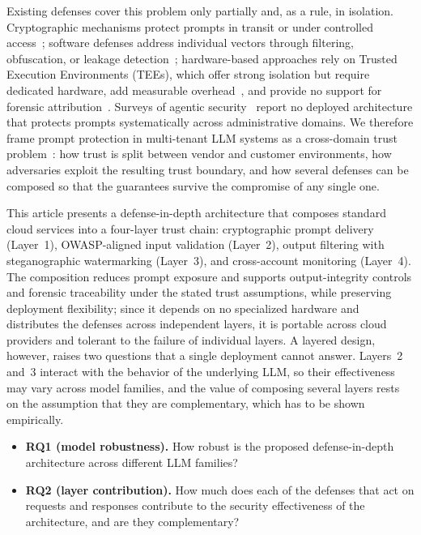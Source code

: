 Existing defenses cover this problem only partially and, as a rule, in isolation. Cryptographic mechanisms protect prompts in transit or under controlled access~\cite{vanWyk2023protect}; software defenses address individual vectors through filtering, obfuscation, or leakage detection~\cite{proxyprompt2025,sysvec2025,encryptedprompt2025,promptguard2026,promptkeeper2024}; hardware-based approaches rely on Trusted Execution Environments (TEEs), which offer strong isolation but require dedicated hardware, add measurable overhead~\cite{teeperf2025}, and provide no support for forensic attribution~\cite{petridish2024,omega2025}. Surveys of agentic security~\cite{agenticsecurity2025} report no deployed architecture that protects prompts systematically across administrative domains. We therefore frame prompt protection in multi-tenant LLM systems as a cross-domain trust problem~\cite{saltzer1975protection,rose2020zero,agenticsecurity2025}: how trust is split between vendor and customer environments, how adversaries exploit the resulting trust boundary, and how several defenses can be composed so that the guarantees survive the compromise of any single one.

This article presents a defense-in-depth architecture that composes standard cloud services into a four-layer trust chain: cryptographic prompt delivery (Layer~1), OWASP-aligned input validation (Layer~2), output filtering with steganographic watermarking (Layer~3), and cross-account monitoring (Layer~4). The composition reduces prompt exposure and supports output-integrity controls and forensic traceability under the stated trust assumptions, while preserving deployment flexibility; since it depends on no specialized hardware and distributes the defenses across independent layers, it is portable across cloud providers and tolerant to the failure of individual layers. A layered design, however, raises two questions that a single deployment cannot answer. Layers~2 and~3 interact with the behavior of the underlying LLM, so their effectiveness may vary across model families, and the value of composing several layers rests on the assumption that they are complementary, which has to be shown empirically.

\begin{itemize}
\item \textbf{RQ1 (model robustness).} How robust is the proposed defense-in-depth architecture across different LLM families?
\item \textbf{RQ2 (layer contribution).} How much does each of the defenses that act on requests and responses contribute to the security effectiveness of the architecture, and are they complementary?
\end{itemize}

